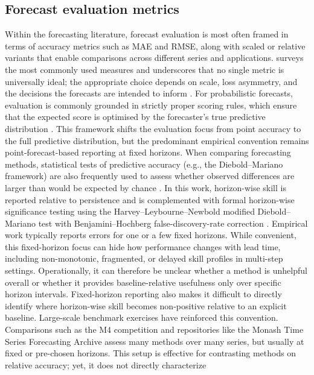\documentclass[pdflatex,sn-mathphys]{sn-jnl}
\begin{document}
\subsection{Forecast evaluation metrics}
Within the forecasting literature, forecast evaluation is most often framed in terms of
accuracy metrics such as MAE and RMSE, along with scaled or relative variants that enable
comparisons across different series and applications. \citet{hyndman2006} surveys
the most commonly used measures and underscores that no single metric is universally ideal;
the appropriate choice depends on scale, loss asymmetry, and the decisions the forecasts are
intended to inform \citep{petropoulos2022}.
For probabilistic forecasts, evaluation is commonly grounded in strictly proper scoring rules,
which ensure that the expected score is optimised by the forecaster's true predictive
distribution \citep{gneiting2007}. This framework shifts the evaluation focus from
point accuracy to the full predictive distribution, but the predominant empirical convention
remains point-forecast-based reporting at fixed horizons.
When comparing forecasting methods, statistical tests of predictive accuracy (e.g., the
Diebold–Mariano framework) are also frequently used to assess whether observed differences
are larger than would be expected by chance \citep{diebold1995}. In this work, horizon-wise
skill is reported relative to persistence and is complemented with formal horizon-wise
significance testing using the Harvey--Leybourne--Newbold modified Diebold--Mariano test
\citep{harvey1997} with Benjamini--Hochberg false-discovery-rate correction \citep{benjamini1995}.
Empirical work typically reports errors for one or a few fixed horizons. While convenient, this fixed-horizon focus can hide how performance changes with lead time, including non-monotonic, fragmented, or delayed skill profiles in multi-step settings. Operationally, it can therefore be unclear whether a method is unhelpful overall or whether it provides baseline-relative usefulness only over specific horizon intervals. Fixed-horizon reporting also makes it difficult to directly identify where horizon-wise skill becomes non-positive relative to an explicit baseline.
Large-scale benchmark exercises have reinforced this convention.
Comparisons such as the M4 competition \citep{makridakis2020} and
repositories like the Monash Time Series Forecasting Archive
\citep{godahewa2021} assess many methods over many series, but usually
at fixed or pre-chosen horizons. This setup is effective for contrasting
methods on relative accuracy; yet, it does not directly characterize
\end{document}
